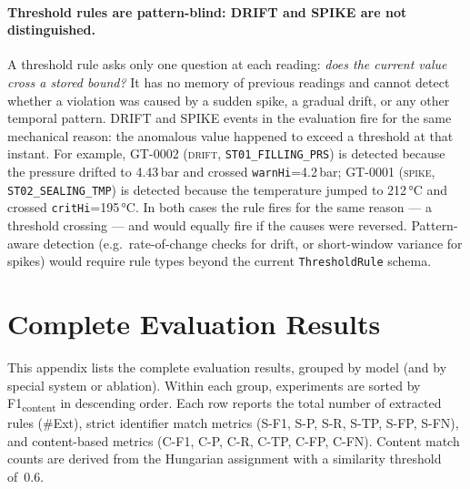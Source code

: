 ﻿\documentclass[11pt]{article}
\begin{document}
\paragraph{Threshold rules are pattern-blind: DRIFT and SPIKE are not distinguished.}
A threshold rule asks only one question at each reading:
\emph{does the current value cross a stored bound?}
It has no memory of previous readings and cannot detect whether a violation
was caused by a sudden spike, a gradual drift, or any other temporal pattern.
DRIFT and SPIKE events in the evaluation fire for the same mechanical reason:
the anomalous value happened to exceed a threshold at that instant.
For example, GT-0002 (\textsc{drift}, \texttt{ST01\_FILLING\_PRS}) is
detected because the pressure drifted to 4.43\,bar and crossed
\texttt{warnHi}=4.2\,bar; GT-0001 (\textsc{spike},
\texttt{ST02\_SEALING\_TMP}) is detected because the temperature jumped to
212\,°C and crossed \texttt{critHi}=195\,°C.
In both cases the rule fires for the same reason — a threshold crossing —
and would equally fire if the causes were reversed.
Pattern-aware detection (e.g.\ rate-of-change checks for drift, or
short-window variance for spikes) would require rule types beyond the
current \texttt{ThresholdRule} schema.

\appendix
\section{Complete Evaluation Results}
\label{app:full_results}

This appendix lists the complete evaluation results, grouped by model (and by
special system or ablation). Within each group, experiments are sorted by
F1\textsubscript{content} in descending order. Each row reports the total number
of extracted rules (\#Ext), strict identifier match metrics (S\nobreakdash-F1,
S\nobreakdash-P, S\nobreakdash-R, S\nobreakdash-TP, S\nobreakdash-FP,
S\nobreakdash-FN), and content-based metrics (C\nobreakdash-F1,
C\nobreakdash-P, C\nobreakdash-R, C\nobreakdash-TP, C\nobreakdash-FP,
C\nobreakdash-FN). Content match counts are derived from the Hungarian assignment
with a similarity threshold of~0.6.
\end{document}
